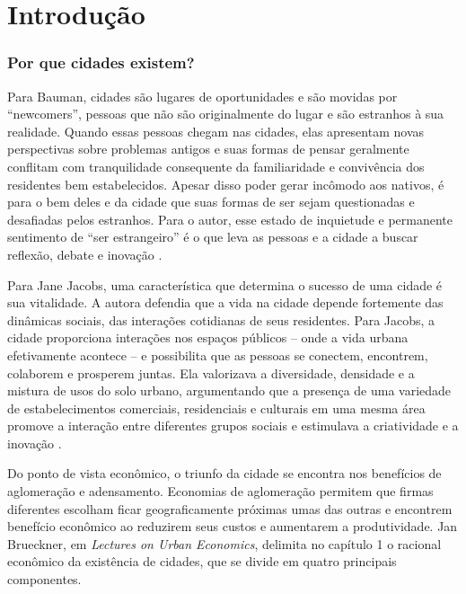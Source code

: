 




\chapter{Introdução}

\subsection*{\textbf{Por que cidades existem?}}

Para Bauman, cidades são lugares de oportunidades e são movidas por ``newcomers'', pessoas que não são originalmente do lugar e são estranhos à sua realidade. Quando essas pessoas chegam nas cidades, elas apresentam novas perspectivas sobre problemas antigos e suas formas de pensar geralmente conflitam com tranquilidade consequente da familiaridade e convivência dos residentes bem estabelecidos. Apesar disso poder gerar incômodo aos nativos, é para o bem deles e da cidade que suas formas de ser sejam questionadas e desafiadas pelos estranhos. Para o autor, esse estado de inquietude e permanente sentimento de ``ser estrangeiro'' é o que leva as pessoas e a cidade a buscar reflexão, debate e inovação \cite{bauman2003city}.

Para Jane Jacobs, uma característica que determina o sucesso de uma cidade é sua vitalidade. A autora defendia que a vida na cidade depende fortemente das dinâmicas sociais, das interações cotidianas de seus residentes. Para Jacobs, a cidade proporciona interações nos espaços públicos -- onde a vida urbana efetivamente acontece -- e possibilita que as pessoas se conectem, encontrem, colaborem e prosperem juntas. Ela valorizava a diversidade, densidade e a mistura de usos do solo urbano, argumentando que a presença de uma variedade de estabelecimentos comerciais, residenciais e culturais em uma mesma área promove a interação entre diferentes grupos sociais e estimulava a criatividade e a inovação \cite{jacobs1961death}.

Do ponto de vista econômico, o triunfo da cidade se encontra nos benefícios de aglomeração e adensamento. Economias de aglomeração permitem que firmas diferentes escolham ficar geograficamente próximas umas das outras e encontrem benefício econômico ao reduzirem seus custos e aumentarem a produtividade. Jan Brueckner, em \textit{Lectures on Urban Economics}, delimita no capítulo 1 o racional econômico da existência de cidades, que se divide em quatro principais componentes.

